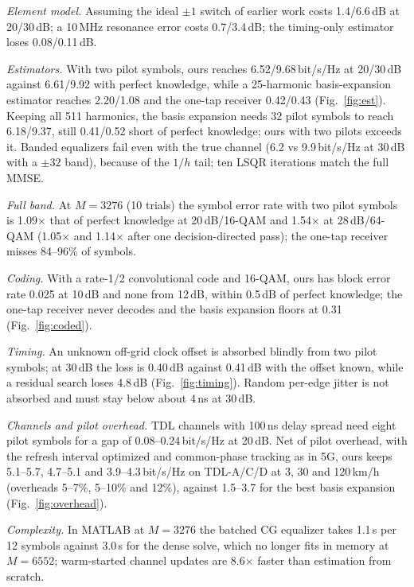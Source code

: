 \documentclass[journal]{IEEEtran}
\begin{document}
\emph{Element model.} Assuming the ideal $\pm1$ switch of earlier work costs
1.4/6.6\,dB at 20/30\,dB; a 10\,MHz resonance error costs 0.7/3.4\,dB; the
timing-only estimator loses 0.08/0.11\,dB. %

\emph{Estimators.} With two pilot symbols, ours reaches 6.52/9.68\,bit/s/Hz at
20/30\,dB against 6.61/9.92 with perfect knowledge, while a 25-harmonic
basis-expansion estimator reaches 2.20/1.08 and the one-tap receiver 0.42/0.43
(Fig.~\ref{fig:est}). Keeping all 511 harmonics, the basis expansion needs 32
pilot symbols to reach 6.18/9.37, still 0.41/0.52 short of perfect knowledge; ours with two pilots exceeds it. Banded equalizers
fail even with the true channel (6.2 vs 9.9\,bit/s/Hz at 30\,dB with a $\pm32$ band),
because of the $1/h$ tail; ten LSQR iterations match the full MMSE.

\emph{Full band.} At $M=3276$ (10 trials) the symbol error rate with two pilot
symbols is 1.09$\times$ that of perfect knowledge at 20\,dB/16-QAM and
1.54$\times$ at 28\,dB/64-QAM (1.05$\times$ and 1.14$\times$ after one
decision-directed pass); the one-tap receiver misses 84--96\% of symbols.

\emph{Coding.} With a rate-1/2 convolutional code and 16-QAM, ours has block error
rate 0.025 at 10\,dB and none from 12\,dB, within 0.5\,dB of perfect knowledge;
the one-tap receiver never decodes and the basis expansion floors at 0.31
(Fig.~\ref{fig:coded}). %

\emph{Timing.} An unknown off-grid clock offset is absorbed blindly from two
pilot symbols; at 30\,dB the loss is 0.40\,dB against 0.41\,dB with the offset
known, while a residual search loses 4.8\,dB (Fig.~\ref{fig:timing}). Random
per-edge jitter is not absorbed and must stay below about 4\,ns at 30\,dB.

\emph{Channels and pilot overhead.} TDL channels with 100\,ns delay spread need
eight pilot symbols for a gap of 0.08--0.24\,bit/s/Hz at 20\,dB. Net of pilot
overhead, with the refresh interval optimized and common-phase tracking as in 5G,
ours keeps 5.1--5.7, 4.7--5.1 and 3.9--4.3\,bit/s/Hz on TDL-A/C/D at 3, 30 and
120\,km/h (overheads 5--7\%, 5--10\% and 12\%), against 1.5--3.7 for the best
basis expansion (Fig.~\ref{fig:overhead}).

\emph{Complexity.} In MATLAB at $M=3276$ the batched CG equalizer takes 1.1\,s per
12 symbols against 3.0\,s for the dense solve, which no longer fits in memory at
$M=6552$; warm-started channel updates are 8.6$\times$ faster than estimation
from scratch. %
\end{document}
